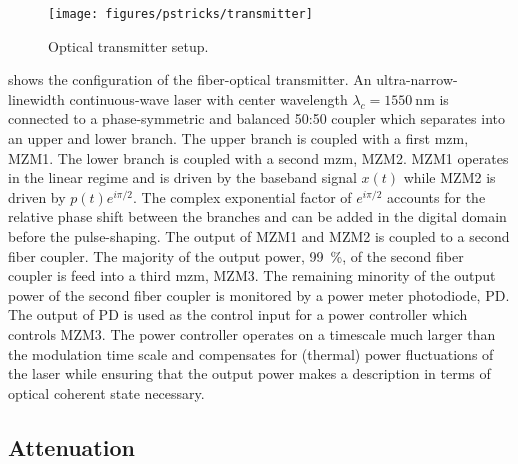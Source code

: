 \begin{figure}[htb]
	\centering
	\texttt{[image: figures/pstricks/transmitter]}
	\caption{Optical transmitter setup.}\label{fig:optical_transmitter}
\end{figure}
 shows the configuration of the fiber-optical transmitter.
An ultra-narrow-linewidth continuous-wave laser with center wavelength $\lambda_c=\SI{1550}{\nano\meter}$ is connected to a phase-symmetric and balanced 50:50 coupler which separates into an upper and lower branch.
The upper branch is coupled with a first \gls{mzm}, MZM1.
The lower branch is coupled with a second \gls{mzm}, MZM2.
MZM1 operates in the linear regime and is driven by the baseband signal $x(t)$ while MZM2 is driven by $p(t)e^{i\pi/2}$.
The complex exponential factor of $e^{i\pi/2}$ accounts for the relative phase shift between the branches and can be added in the digital domain before the pulse-shaping.
The output of MZM1 and MZM2 is coupled to a second fiber coupler.
The majority of the output power, \SI{99}{\percent}, of the second fiber coupler is feed into a third \gls{mzm}, MZM3.
The remaining minority of the output power of the second fiber coupler is monitored by a power meter photodiode, PD.
The output of PD is used as the control input for a power controller which controls MZM3.
The power controller operates on a timescale much larger than the modulation time scale and compensates for (thermal) power fluctuations of the laser while ensuring that the output power makes a description in terms of optical coherent state necessary.


\FloatBarrier
\subsection{Attenuation}

